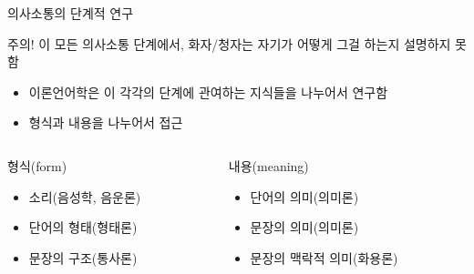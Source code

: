 \documentclass[11pt, aspectratio=169]{beamer}
\begin{document}
\begin{frame}[t]{의사소통의 단계적 연구}
    \begin{block}{주의!}
      이 모든 의사소통 단계에서, 화자/청자는 자기가 어떻게 그걸 하는지 설명하지 못함
    \end{block}  
    \begin{itemize}
      \item 이론언어학은 이 각각의 단계에 관여하는 지식들을 나누어서 연구함
      \item 형식과 내용을 나누어서 접근
    \end{itemize}

    \begin{columns}
      \begin{column}{0.5\textwidth}
        \begin{block}{형식(form)}
          \begin{itemize}
            \item 소리(음성학, 음운론)
            \item 단어의 형태(형태론)
            \item 문장의 구조(통사론)
          \end{itemize}
        \end{block}
        
      \end{column}
      \begin{column}{0.5\textwidth}
        \begin{block}{내용(meaning)}
          \begin{itemize}
            \item 단어의 의미(의미론)
            \item 문장의 의미(의미론)
            \item 문장의 맥락적 의미(화용론)
          \end{itemize}
        \end{block}
      \end{column}
    \end{columns}
\end{frame}
\end{document}
